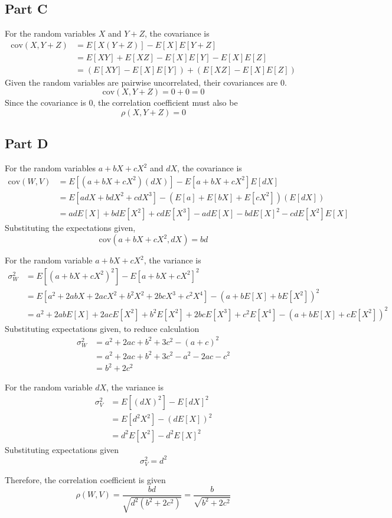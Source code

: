 \documentclass{article}
\begin{document}
\subsection*{Part C}

For the random variables $X$ and $Y + Z$, the covariance is
\begin{align*}
  \mathrm{cov}(X, Y + Z) &= E[X(Y + Z)] - E[X]E[Y + Z] \\
  &= E[XY] + E[XZ] - E[X]E[Y] - E[X]E[Z] \\
  &= (E[XY] - E[X]E[Y]) + (E[XZ] - E[X]E[Z])
\end{align*}
Given the random variables are pairwise uncorrelated, their covariances are
$0$.
$$ \mathrm{cov}(X, Y + Z) = 0 + 0 = 0 $$
Since the covariance is $0$, the correlation coefficient must also be
$$ \rho(X, Y + Z) = 0 $$

\subsection*{Part D}

For the random variables $a + bX + cX^2$ and $dX$, the covariance is
\begin{align*}
  \mathrm{cov}(W, V) &= E[(a + bX + cX^2)(dX)] - E[a + bX + cX^2]E[dX] \\
  &= E[adX + bdX^2 + cdX^3] - (E[a] + E[bX] + E[cX^2])(E[dX]) \\
  &= adE[X] + bdE[X^2] + cdE[X^3] - adE[X] - bdE[X]^2 - cdE[X^2]E[X]
\end{align*}
Substituting the expectations given,
$$ \mathrm{cov}(a + bX + cX^2, dX) = bd $$

For the random variable $a + bX + cX^2$, the variance is
\begin{align*}
  \sigma_W^2 &= E[(a + bX + cX^2)^2] - E[a + bX + cX^2]^2 \\
  &= E[a^2 + 2abX + 2acX^2 + b^2 X^2 + 2bc X^3 + c^2 X^4] - (a + bE[X] +
  bE[X^2])^2 \\
  &= a^2 + 2abE[X] + 2acE[X^2] + b^2 E[X^2] + 2bc E[X^3] + c^2 E[X^4] - (a +
  bE[X] + cE[X^2])^2
\end{align*}
Substituting expectations given, to reduce calculation
\begin{align*}
  \sigma_W^2 &= a^2 + 2ac + b^2 + 3c^2 - (a + c)^2 \\
  &= a^2 + 2ac + b^2 + 3c^2 - a^2 - 2ac - c^2 \\
  &= b^2 + 2c^2
\end{align*}

For the random variable $dX$, the variance is 
\begin{align*}
  \sigma_V^2 &= E[(dX)^2] - E[dX]^2 \\
  &= E[d^2X^2] - (dE[X])^2 \\
  &= d^2E[X^2] - d^2E[X]^2
\end{align*}
Substituting expectations given
$$ \sigma_V^2 = d^2 $$

Therefore, the correlation coefficient is given
$$ \rho(W, V) = \frac{bd}{\sqrt{d^2(b^2 + 2 c^2)}} = \frac{b}{\sqrt{b^2 + 2
c^2}} $$
\end{document}
